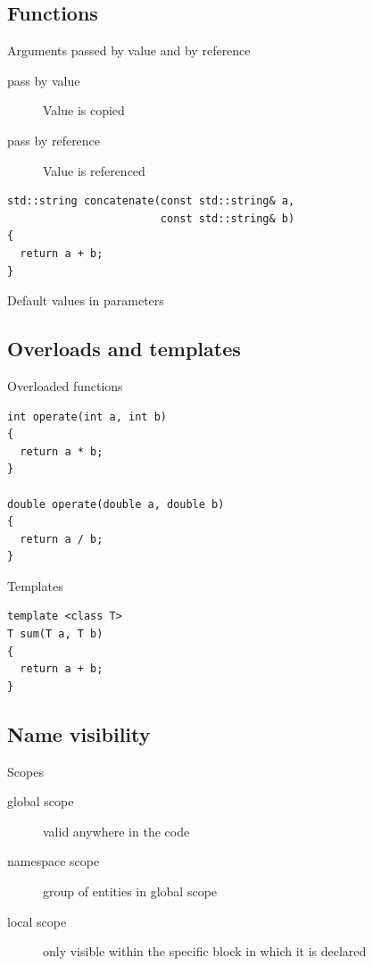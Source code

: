 \documentclass{beamer}
\begin{document}
\subsection{Functions}
\begin{frame}

\end{frame}

\begin{frame}[fragile]{Arguments passed by value and by reference}
\begin{description}
\item[pass by value] Value is copied
\item[pass by reference] Value is referenced
\end{description}
\begin{lstlisting}[caption=Const reference parameter]
std::string concatenate(const std::string& a,
                        const std::string& b)
{
  return a + b;
}
\end{lstlisting}
\end{frame}

\begin{frame}[fragile]{Default values in parameters}

\end{frame}

\subsection{Overloads and templates}
\begin{frame}[fragile]{Overloaded functions}
\begin{lstlisting}[caption=Overloaded functions]
int operate(int a, int b)
{
  return a * b;
}

double operate(double a, double b)
{
  return a / b;
}
\end{lstlisting}
\end{frame}

\begin{frame}[fragile]{Templates}
\begin{lstlisting}[caption=Templates]
template <class T>
T sum(T a, T b)
{
  return a + b;
}\end{lstlisting}
\end{frame}

\subsection{Name visibility}
\begin{frame}{Scopes}
\begin{description}
\item[global scope] valid anywhere in the code
\item[namespace scope] group of entities in global scope
\item[local scope] only visible within the specific block in which it is
declared
\end{description}
\end{frame}
\end{document}
